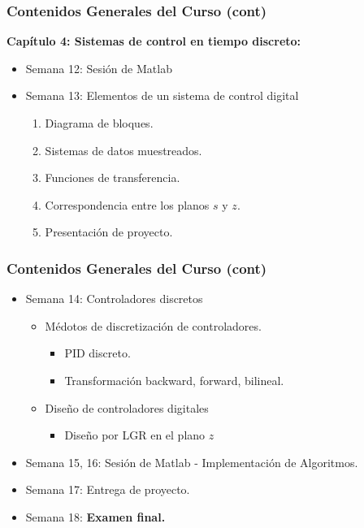 \documentclass[aspectratio=169,handout]{beamer}
\theoremstyle{definition}
\theoremstyle{plain}
\theoremstyle{remark}
\newcounter{saveenumi}
\newcommand{\seti}{\setcounter{saveenumi}{\value{enumi}}}
\newcommand{\conti}{\setcounter{enumi}{\value{saveenumi}}}
\begin{document}
\begin{frame}[<+->]\frametitle{Contenidos Generales del Curso (cont)}
\textbf{Capítulo 4: Sistemas de control en tiempo discreto:}
\begin{itemize}
  \conti
  \item Semana 12: Sesión de Matlab
  \item Semana 13: Elementos de un sistema de control digital
  \begin{enumerate}
    \item Diagrama de bloques.
    \item Sistemas de datos muestreados.
    \item Funciones de transferencia.
    \item Correspondencia entre los planos $s$ y $z$.
    \item Presentación de proyecto.
  \end{enumerate}
  \seti
\end{itemize}
\end{frame}

\begin{frame}[<+->]\frametitle{Contenidos Generales del Curso (cont)}
\begin{itemize}
  \conti
  \item Semana 14: Controladores discretos
  \begin{itemize}
    \item Médotos de discretización de controladores.
    \begin{itemize}
      \item PID discreto.
      \item Transformación backward, forward, bilineal.
    \end{itemize}
    \item Diseño de controladores digitales
    \begin{itemize}
      \item Diseño por LGR en el plano $z$
    \end{itemize}
  \end{itemize}
  \item Semana 15, 16: Sesión de Matlab - Implementación de Algoritmos.
  \item Semana 17: Entrega de proyecto.
  \item Semana 18: \textbf{Examen final.}
  \seti
\end{itemize}
\end{frame}
\end{document}
